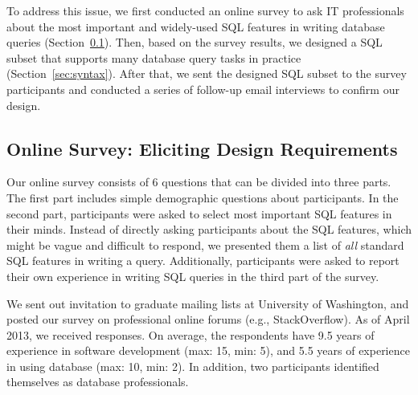 To address this issue, we first conducted an online survey
to ask IT professionals about the most important and widely-used
SQL features in writing database queries (Section~\ref{sec:survey}).
Then, based on the survey results, we designed
a SQL subset that supports many database query tasks
in practice (Section~\ref{sec:syntax}).  After that,
we sent the designed SQL subset to the survey participants
and conducted a series of follow-up email interviews
to confirm our design.









\subsection{Online Survey: Eliciting Design Requirements}
\label{sec:survey}


Our online survey consists of 6 questions that can be
divided into three parts. The first part includes
simple demographic questions about participants.
In the second part, participants were asked to select
most important SQL features in their minds.
Instead of directly asking participants about the SQL
features, which might be vague and difficult to respond,
we presented them a list of \textit{all} standard
SQL features in writing a query.
Additionally, participants were asked to report their 
own experience in writing SQL queries in the third part of the survey.



We sent out invitation to graduate mailing lists at
University of Washington, and posted our survey on
professional online forums (e.g., StackOverflow).
As of April 2013, we received \respnum responses.
On average, the respondents have 9.5 years of experience
in software development (max: 15, min: 5),
and 5.5 years of experience in
using database (max: 10, min: 2). In addition, two
participants identified themselves as database professionals.

